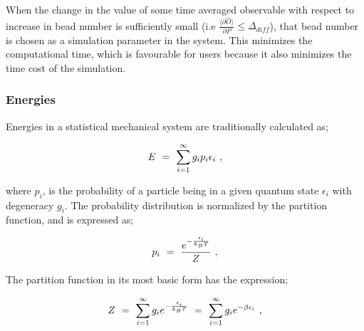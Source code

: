 \documentclass[11pt]{article}
\begin{document}
When the change in the value of some time averaged observable with respect to increase in bead number is sufficiently small (i.e \begin{math} \frac{\langle \partial{\hat{O}} \rangle}{\partial{P}} \leq \Delta_{diff} \end{math}), that bead number is chosen as a simulation parameter in the system. This minimizes the computational time, which is favourable for users because it also minimizes the time cost of the simulation.

\subsubsection{Energies}

Energies in a statistical mechanical system are traditionally calculated as;

\begin{equation} \label{wr-eq-30-1}
E \hspace{0.125cm} = \hspace{0.125cm} \sum_{i = 1}^{\infty} g_i p_i \epsilon_{i} \hspace{0.125cm} ,
\end{equation}

where \begin{math} p_i \end{math}, is the probability of a particle being in a given quantum state \begin{math} \epsilon_{i} \end{math} with degeneracy \begin{math} g_{i} \end{math}. The probability distribution is normalized by the partition function, and is expressed as;

\begin{equation} \label{wr-eq-31-1}
p_i \hspace{0.125cm} = \hspace{0.125cm} \frac{ e^{-\frac{ \epsilon_i}{k_B T}}}{Z}  \hspace{0.125cm} ,
\end{equation}

The partition function in its most basic form has the expression;

\begin{equation} \label{wr-eq-32-1}
Z \hspace{0.125cm} = \hspace{0.125cm} \sum_{i = 1}^{\infty} g_i e^{-\frac{ \epsilon_i}{k_B T}} \hspace{0.125cm} = \hspace{0.125cm} \sum_{i = 1}^{\infty} g_i e^{- \beta \epsilon_i} \hspace{0.125cm} ,
\end{equation}
\end{document}
